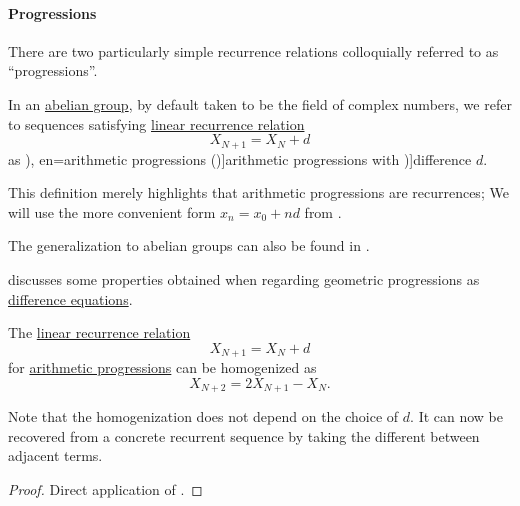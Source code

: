 \paragraph{Progressions}

There are two particularly simple recurrence relations colloquially referred to as \enquote{progressions}.

\begin{definition}\label{def:arithmetic_progression}\mimprovised
  In an \hyperref[def:abelian_group]{abelian group}, by default taken to be the field of complex numbers, we refer to sequences satisfying \hyperref[def:linear_recurrence]{linear recurrence relation}
  \begin{equation}\label{eq:def:arithmetic_progression/recurrence}
    X_{N+1} = X_N + d
  \end{equation}
  as \term[ru=арифметические прогрессии (\cite[143]{АлександровМаркушевичХинчинИПр1952ЭнциклопедияТом3}), en=arithmetic progressions (\cite[def. 2.4.3]{Rosen2019DiscreteMathematics})]{arithmetic progressions} with \term[en=common difference (\cite[def. 2.4.3]{Rosen2019DiscreteMathematics})]{difference} \( d \).
\end{definition}
\begin{comments}
  \item This definition merely highlights that arithmetic progressions are recurrences; We will use the more convenient form \( x_n = x_0 + nd \) from .

  \item The generalization to abelian groups can also be found in .

  \item {} discusses some properties obtained when regarding geometric progressions as \hyperref[def:difference_equation]{difference equations}.
\end{comments}

\begin{proposition}\label{thm:arithmetic_progression_homogeneization}
  The \hyperref[def:linear_recurrence]{linear recurrence relation}
  \begin{equation*}
    X_{N+1} = X_N + d
  \end{equation*}
  for \hyperref[def:arithmetic_progression]{arithmetic progressions} can be homogenized as
  \begin{equation}\label{eq:thm:arithmetic_progression_homogeneization}
    X_{N+2} = 2 X_{N+1} - X_N.
  \end{equation}
\end{proposition}
\begin{comments}
  \item Note that the homogenization does not depend on the choice of \( d \). It can now be recovered from a concrete recurrent sequence by taking the different between adjacent terms.
\end{comments}
\begin{proof}
  Direct application of .
\end{proof}

